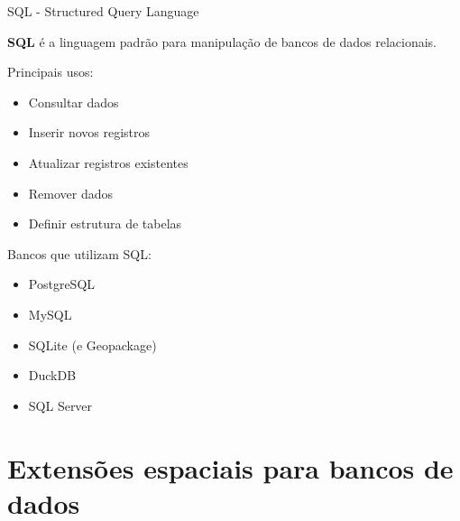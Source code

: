 \documentclass{beamer}
\begin{document}
\begin{frame}{SQL - Structured Query Language}
    
    \textbf{SQL} é a linguagem padrão para manipulação de bancos de dados relacionais.
    
    \vspace{0.4cm}
    
    Principais usos:
    
    \begin{itemize}
        \item Consultar dados
        \item Inserir novos registros
        \item Atualizar registros existentes
        \item Remover dados
        \item Definir estrutura de tabelas
    \end{itemize}
    
    \vspace{0.4cm}
    
    Bancos que utilizam SQL:
    
    \begin{itemize}
        \item PostgreSQL 
        \item MySQL
        \item SQLite (e Geopackage)
        \item DuckDB
        \item SQL Server
    \end{itemize}
    
\end{frame}



\section{Extensões espaciais para bancos de dados}
\end{document}
